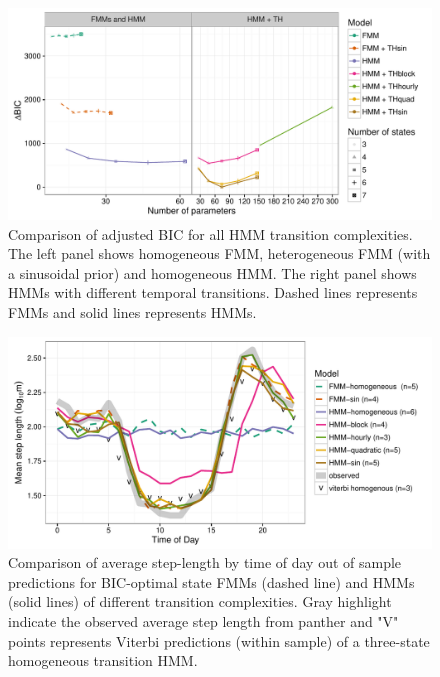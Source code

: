 \documentclass{bmcart}
\begin{document}
\clearpage

  \begin{figure}[h!]
   \includegraphics[width=5in]{figure/Figure-2}
  \caption{Comparison of adjusted BIC for all HMM transition complexities. The left panel shows homogeneous FMM, heterogeneous FMM (with a sinusoidal prior) and homogeneous HMM. The right panel shows HMMs with different temporal transitions. Dashed lines represents FMMs and solid lines represents HMMs.}
      \end{figure}
      
      
\clearpage
      
\begin{figure}[h!]
   \includegraphics[width=5in]{figure/Figure-3}
  \caption{Comparison of average step-length by time of day out of sample predictions for BIC-optimal state FMMs (dashed line) and HMMs (solid lines) of different transition complexities. Gray highlight indicate the observed average step length from panther and "V" points represents Viterbi predictions (within sample) of a three-state homogeneous transition HMM.}
      \end{figure}

\clearpage
\end{document}
